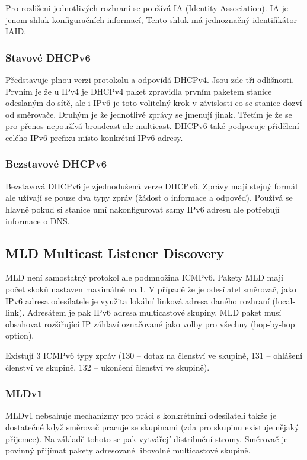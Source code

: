 Pro rozlišeni jednotlivých rozhraní se používá IA (Identity Association). IA je jenom shluk konfiguračních informací, Tento shluk má jednoznačný identifikátor IAID.

\subsubsection{Stavové DHCPv6}

Představuje plnou verzi protokolu a odpovídá DHCPv4.
Jsou zde tři odlišnosti.
Prvním je že u IPv4 je DHCPv4 paket zpravidla prvním paketem stanice odeslaným do sítě, ale i IPv6 je toto volitelný krok v závislosti co se stanice dozví od směrovače.
Druhým je že jednotlivé zprávy se jmenují jinak.
Třetím je že se pro přenos nepoužívá broadcast ale multicast.
DHCPv6 také podporuje přidělení celého IPv6 prefixu místo konkrétní IPv6 adresy.

\subsubsection{Bezstavové DHCPv6}

Bezstavová DHCPv6 je zjednodušená verze DHCPv6.
Zprávy mají stejný formát ale užívají se pouze dva typy zpráv (žádost o informace a odpověď).
Používá se hlavně pokud si stanice umí nakonfigurovat samy IPv6 adresu ale potřebují informace o DNS.

\subsection{MLD Multicast Listener Discovery}

MLD není samostatný protokol ale podmnožina ICMPv6.
Pakety MLD mají počet skoků nastaven maximálně na 1.
V případě že je odesílatel směrovač, jako IPv6 adresa odesílatele je využita lokální linková adresa daného rozhraní (local-link).
Adresátem je pak IPv6 adresa multicastové skupiny.
MLD paket musí obsahovat rozšiřující IP záhlaví označované jako volby pro všechny (hop-by-hop option).

Existují 3 ICMPv6 typy zpráv (130 -- dotaz na členství ve skupině, 131 -- ohlášení členství ve skupině, 132 -- ukončení členství ve skupině).


\subsubsection{MLDv1}

MLDv1 nebsahuje mechanizmy pro práci s konkrétními odesílateli takže je dostatečné když směrovač pracuje se skupinami (zda pro skupinu existuje nějaký příjemce).
Na základě tohoto se pak vytvářejí distribuční stromy.
Směrovač je povinný přijímat pakety adresované libovolné multicastové skupině.

